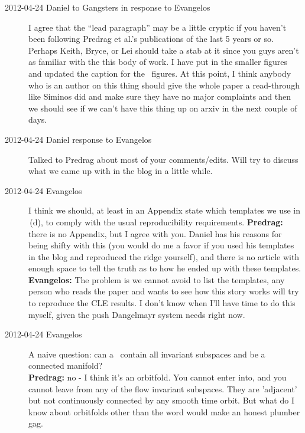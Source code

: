 \begin{description}
\item[2012-04-24 Daniel to Gangsters in response to Evangelos] I
agree that the ``lead paragraph'' may be a little cryptic if you haven't
been following Predrag et al.'s  publications of the last 5 years or so.
Perhaps Keith, Bryce, or Lei should take a stab at it since you guys
aren't as familiar with the this body of work. I have put in the smaller
figures and updated the caption for the \cLe\ figures. At this point, I
think anybody who is  an author on this thing should give the whole paper
a read-through like Siminos did and make sure they have no major
complaints and then we should see if we can't have this thing up on arxiv
in the next couple of days.

\item[2012-04-24 Daniel response to Evangelos] Talked to Predrag about
most of your comments/edits. Will try to discuss what we came up with in
the blog in a little while.

\item[2012-04-24 Evangelos]
I think we should, at least in an Appendix state which templates we use
in \,(d), to comply with the usual reproducibility
requirements. {\bf Predrag:} there is no Appendix, but I agree with you.
Daniel has his reasons for being shifty with this (you would do me a
favor if you used his templates in the blog and reproduced the ridge
yourself), and there is no article with enough space to tell the truth as
to how he ended up with these templates. {\bf Evangelos:} The problem is
we cannot avoid to list the templates, any person who reads the paper
and wants to see how this story works will try to reproduce the CLE results.
I don't know when I'll have time to do this myself, given the push Dangelmayr
system needs right now.


\item[2012-04-24 Evangelos]
A naive question:
can a \chartBord\ contain all invariant subspaces and be a connected
manifold?
\\
{\bf Predrag:} no - I think it's an orbitfold. You cannot enter into, and
you cannot leave from any of the flow invariant subspaces. They are
'adjacent' but not continuously connected by any smooth time orbit. But
what do I know about orbitfolds other than the word would make an honest
plumber gag.


\end{description}
